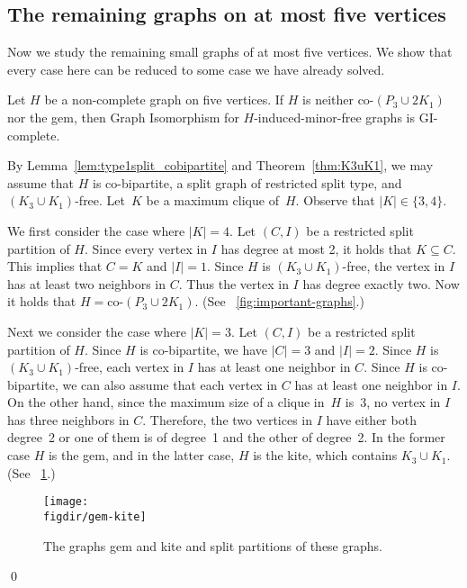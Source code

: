 \documentclass[envcountsame,envcountsect,11pt,a4paper]{llncs}
\renewenvironment{proof}{\begin{Proof}}{\qed\end{Proof}}
\newcommand{\figref}[1]{\figurename~\ref{#1}}
\newcommand{\figdir}{.}
\begin{document}
\subsection{The remaining graphs on at most five vertices}
Now we study the remaining small graphs of at most five vertices.
We show that every case here can be reduced to some case we have already solved.
\begin{lemma}
Let $H$ be a non-complete graph on five vertices.
If $H$ is neither co-$(P_{3} \cup 2 K_{1})$ 
nor the gem,
then {\sc Graph Isomorphism} for $H$-induced-minor-free graphs is GI-complete.
\end{lemma}
\begin{proof}
By Lemma~\ref{lem:type1split_cobipartite} and Theorem~\ref{thm:K3uK1},
we may assume that $H$ is co-bipartite, a split graph of restricted split type, and $(K_{3} \cup K_{1})$-free.
Let~$K$ be a maximum clique of~$H$. Observe that $|K| \in \{3, 4\}$.

We first consider the case where $|K| = 4$.
Let $(C, I)$ be a restricted split partition of $H$.
Since every vertex in $I$ has degree at most 2, it holds that $K \subseteq C$.
This implies that $C = K$ and $|I| = 1$.
Since $H$ is $(K_{3} \cup K_{1})$-free, the vertex in $I$ has at least two neighbors in $C$.
Thus the vertex in $I$ has degree exactly two.
Now it holds that $H = \textrm{co-}(P_{3} \cup 2 K_{1})$.
(See \figref{fig:important-graphs}.)

Next we consider the case where $|K| = 3$.
Let $(C, I)$ be a restricted split partition of $H$.
Since $H$ is co-bipartite, we have $|C| = 3$ and $|I| = 2$.
Since $H$ is $(K_{3} \cup K_{1})$-free, each vertex in $I$ has at least one neighbor in $C$.
Since $H$ is co-bipartite, we can also assume that each vertex in $C$ has at least one neighbor in $I$.
On the other hand, since the maximum size of a clique in~$H$ is~$3$, no vertex in $I$ has three neighbors in $C$.
Therefore, the two vertices in $I$ have either both degree~2 or one of them is of degree~1 and the other of degree~2.
In the former case $H$ is the gem, and in the latter case, $H$ is the kite, which contains $K_{3} \cup K_{1}$.
(See \figref{fig:gem-kite}.)
\begin{figure}[htb]
  \centering
  \texttt{[image: \\figdir/gem-kite]}
  \caption{The graphs gem and kite and split partitions of these graphs.}
  \label{fig:gem-kite}
\end{figure}
\end{proof}
\end{document}
